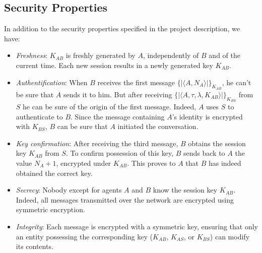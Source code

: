 \subsection {Security Properties}
In addition to the security properties specified in the project description, we have:
\begin{itemize}
    \item \textit{Freshness}: $K_{AB}$ is freshly generated by $A$, independently of $B$ and of the current time. Each new session results in a newly generated key $K_{AB}$.
    \item \textit{Authentification}: When $B$ receives the first message $ \{|\langle A,N_A \rangle|\}_{K_{AB}}$,
            he can't be sure that $A$ sends it to him. But after receiving $\{| \langle A, \tau, \lambda, K_{AB} \rangle |\}_{K_{BS}}$
            from $S$ he can be sure of the origin of the first message. Indeed, $A$ uses $S$ to authenticate to $B$. Since the
            message containing $A$’s identity is encrypted with $K_{BS}$, $B$ can be sure that $A$ initiated the conversation.
    \item \textit{Key confirmation}: After receiving the third message, $B$ obtains the session key $K_{AB}$ from $S$.
                To confirm possession of this key, $B$ sends back to $A$ the value $N_A + 1$, encrypted under $K_{AB}$.
                This proves to $A$ that $B$ has indeed obtained the correct key.

    \item \textit{Secrecy}: Nobody except for agents $A$ and $B$ know the session key $K_{AB}$. Indeed, all messages
            transmitted over the network are encrypted using symmetric encryption.
    \item \textit{Integrity}: Each message is encrypted with a symmetric key, ensuring that only an entity possessing
            the corresponding key ($K_{AB}$, $K_{AS}$, or $K_{BS}$) can modify its contents.




\end{itemize}